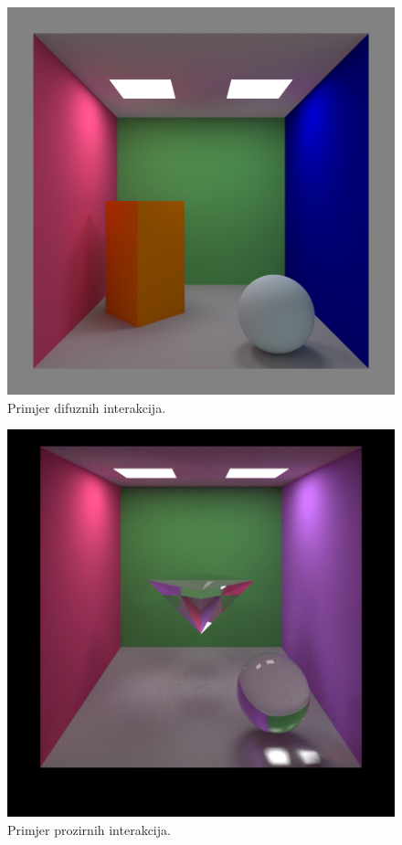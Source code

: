 \documentclass[
12pt, %
oneside, %
english, %
singlespacing, %
parskip, %
headsepline, %
chapterinoneline, %
consistentlayout, %
]{MastersDoctoralThesis} %
\begin{document}
\begin{figure}[h]
	\caption{Primjer difuznih interakcija.}
	\centering
	\includegraphics[width=\textwidth]{demo0.png}
\end{figure}

\begin{figure}[h]
	\caption{Primjer prozirnih interakcija.}
	\centering
	\includegraphics[width=\textwidth]{demo1.png}
\end{figure}
\end{document}
